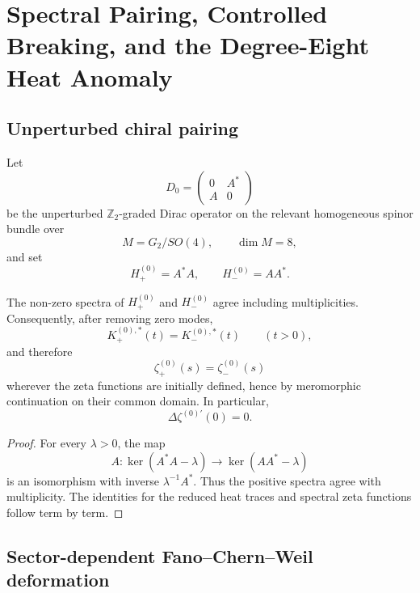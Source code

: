 %

\section{Spectral Pairing, Controlled Breaking, and the Degree-Eight Heat Anomaly}
\label{sec:spectral-pairing-breaking}

\subsection{Unperturbed chiral pairing}

Let
\[
D_0=
\begin{pmatrix}
0 & A^\ast\\
A & 0
\end{pmatrix}
\]
be the unperturbed $\mathbb Z_2$-graded Dirac operator on the relevant homogeneous
spinor bundle over
\[
M=G_2/SO(4),
\qquad \dim M=8,
\]
and set
\[
H_+^{(0)}=A^\ast A,
\qquad
H_-^{(0)}=AA^\ast.
\]

\begin{proposition}
\label{prop:positive-pairing}
The non-zero spectra of $H_+^{(0)}$ and $H_-^{(0)}$ agree including
multiplicities. Consequently, after removing zero modes,
\[
K_+^{(0),\ast}(t)=K_-^{(0),\ast}(t)
\qquad (t>0),
\]
and therefore
\[
\zeta_+^{(0)}(s)=\zeta_-^{(0)}(s)
\]
wherever the zeta functions are initially defined, hence by meromorphic
continuation on their common domain. In particular,
\[
\Delta\zeta^{(0)\prime}(0)=0.
\]
\end{proposition}

\begin{proof}
For every $\lambda>0$, the map
\[
A:\ker(A^\ast A-\lambda)\longrightarrow\ker(AA^\ast-\lambda)
\]
is an isomorphism with inverse $\lambda^{-1}A^\ast$. Thus the positive
spectra agree with multiplicity. The identities for the reduced heat traces
and spectral zeta functions follow term by term.
\end{proof}

\subsection{Sector-dependent Fano--Chern--Weil deformation}

